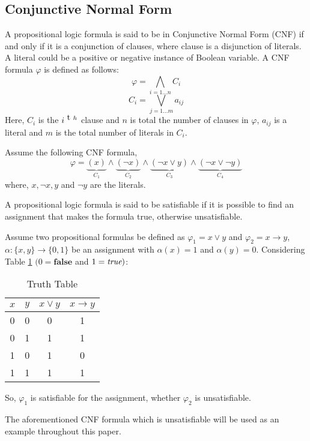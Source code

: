 \subsection{Conjunctive Normal Form}
A propositional logic formula is said to be in Conjunctive Normal Form (CNF) if and only if it is a conjunction of clauses, where clause is a disjunction of literals. A literal could be a positive or negative instance of Boolean variable. A CNF formula $\varphi$ is defined as follows:
$$\varphi = \bigwedge\limits_{i=1\ldots n} C_{i}$$
$$ C_{i} = \bigvee\limits_{j=1\ldots m} a_{ij}$$
Here, $C_{i}$ is the $i^{\text th}$ clause and $n$ is total the number of clauses in $\varphi$, $a_{ij}$ is a literal and $m$ is the total number of literals in $C_{i}$.\newline
\begin{example}
	\label{cnf}
	Assume the following CNF formula,
	$$\varphi=\underbrace{(x)}\limits_{C_{1}}\wedge\underbrace{(\neg x)}\limits_{C_2}\wedge\underbrace{(\neg x\vee y)}\limits_{C_{3}}\wedge\underbrace{(\neg x \vee \neg y)}\limits_{C_{4}}$$
	where, $x, \neg x, y$ and $\neg y$ are the literals.
\end{example}
A propositional logic formula is said to be satisfiable if it is possible to find an assignment that makes the formula true, otherwise unsatisfiable.
\begin{example}
	Assume two propositional formulas be defined as $\varphi_{1}=x\vee y$ and $\varphi_{2}=x\rightarrow y$, $\alpha : \{x, y\}\rightarrow \{0, 1\}$ be an assignment with $\alpha (x)=1$ and $\alpha (y)=0$. Considering Table \ref{truth-table} $(0=\mathbf{false}$ and $1=\emph{true})$:
	\begin{table}[]
		\centering
		\caption{Truth Table}
		\label{truth-table}
		\begin{tabular}{|c|c|c|c|}
			\hline
			$x$ & $y$ & $x \vee y$ & $x\rightarrow y$ \\ \hline
			0   & 0   & 0          & 1                \\ \hline
			0   & 1   & 1          & 1                \\ \hline
			1   & 0   & 1          & 0                \\ \hline
			1   & 1   & 1          & 1                \\ \hline
		\end{tabular}
	\end{table}
	So, $\varphi_{1}$ is satisfiable for the assignment, whether $\varphi_{2}$ is unsatisfiable.
\end{example}
The aforementioned CNF formula which is unsatisfiable will be used as an example throughout this paper.
